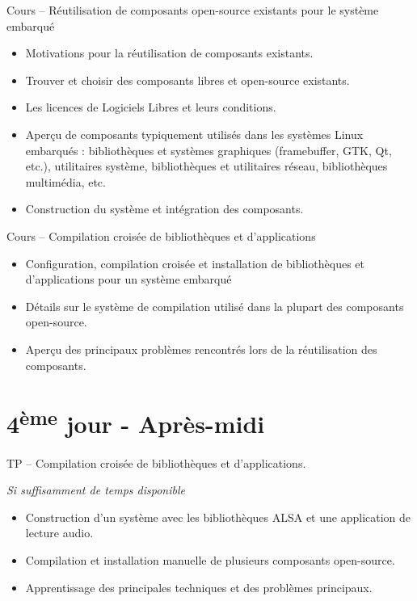\documentclass[a4paper,12pt,obeyspaces,spaces,hyphens]{article}
\begin{document}
\feagendatwocolumn
{Cours – Réutilisation de composants open-source existants pour le système
embarqué}
{
  \begin{itemize}
  \item Motivations pour la réutilisation de composants existants.
  \item Trouver et choisir des composants libres et open-source existants.
  \item Les licences de Logiciels Libres et leurs conditions.
  \item Aperçu de composants typiquement utilisés dans les systèmes
	Linux embarqués : bibliothèques et systèmes graphiques (framebuffer,
	GTK, Qt, etc.), utilitaires système, bibliothèques et
	utilitaires réseau, bibliothèques multimédia, etc.
  \item Construction du système et intégration des composants.
  \end{itemize}
}
{Cours – Compilation croisée de bibliothèques et d'applications}
{
  \begin{itemize}
  \item Configuration, compilation croisée et installation de bibliothèques
	et d'applications pour un système embarqué
  \item Détails sur le système de compilation utilisé dans la plupart
	des composants open-source.
  \item Aperçu des principaux problèmes rencontrés lors de la
	réutilisation des composants.
  \end{itemize}
}

\section{4\textsuperscript{ème} jour - Après-midi}

\feagendaonecolumn
{TP – Compilation croisée de bibliothèques et d'applications.}
{
  {\em Si suffisamment de temps disponible}
  \begin{itemize}
  \item Construction d'un système avec les bibliothèques ALSA et une
	application de lecture audio.
  \item Compilation et installation manuelle de plusieurs
	composants open-source.
  \item Apprentissage des principales techniques et des problèmes principaux.
  \end{itemize}
}
\end{document}
